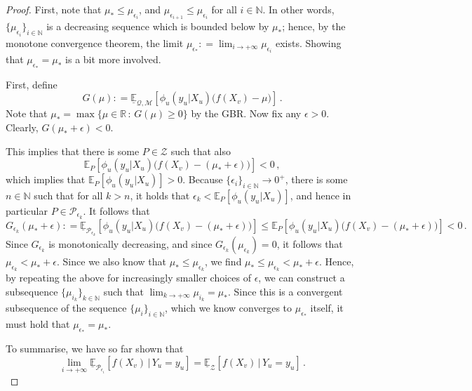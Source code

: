 \documentclass[twoside,11pt]{article}
\newcommand{\nats}{\mathbb{N}}
\newcommand{\reals}{\mathbb{R}}
\newcommand{\lexp}{\underline{\mathbb{E}}_{\rateset,\mathcal{M}}}
\newcommand{\rateset}{\mathcal{Q}}
\newcommand{\coloneqq}{:\!=}
\begin{document}
\begin{proof}
First, note that $\mu_*\leq \mu_{\epsilon_i}$, and $\mu_{\epsilon_{i+1}}\leq \mu_{\epsilon_i}$ for all $i\in\nats$. In other words, $\{\mu_{\epsilon_i}\}_{i\in\nats}$ is a decreasing sequence which is bounded below by $\mu_*$; hence, by the monotone convergence theorem, the limit $\mu_{\epsilon_*}\coloneqq\lim_{i\to+\infty}\mu_{\epsilon_i}$ exists. Showing that $\mu_{\epsilon_*}=\mu_*$ is a bit more involved.

First, define
\begin{equation*}
G(\mu) \coloneqq \lexp[\phi_u(y_u\vert X_u)\bigl(f(X_v) - \mu\bigr)]\,.
\end{equation*}
Note that $\mu_*=\max\{\mu\in\reals\,:\,G(\mu)\geq 0\}$ by the GBR. Now fix any $\epsilon>0$. Clearly, $G(\mu_* + \epsilon)< 0$.

This implies that there is some $P\in\mathcal{Z}$ such that also
\begin{equation*}
\mathbb{E}_P[\phi_u(y_u\vert X_u)\bigl(f(X_v) - (\mu_*+\epsilon)\bigr)] < 0\,,
\end{equation*}
which implies that $\mathbb{E}_P[\phi_u(y_u\vert X_u)]>0$. Because $\{\epsilon_i\}_{i\in\nats}\to 0^+$, there is some $n\in\nats$ such that for all $k>n$, it holds that $\epsilon_k < \mathbb{E}_P[\phi_u(y_u\vert X_u)]$, and hence in particular $P\in\mathcal{P}_{\epsilon_k}$. It follows that
\begin{equation*}
G_{\epsilon_k}(\mu_*+\epsilon) \coloneqq \underline{\mathbb{E}}_{\mathcal{P}_{\epsilon_k}}[\phi_u(y_u\vert X_u)\bigl(f(X_v) - (\mu_*+\epsilon)\bigr)] \leq \mathbb{E}_P[\phi_u(y_u\vert X_u)\bigl(f(X_v) - (\mu_*+\epsilon)\bigr)] < 0\,.
\end{equation*}
Since $G_{\epsilon_k}$ is monotonically decreasing, and since $G_{\epsilon_k}(\mu_{\epsilon_k})=0$, it follows that $\mu_{\epsilon_k} < \mu_*+\epsilon$. Since we also know that $\mu_*\leq \mu_{\epsilon_k}$, we find $\mu_*\leq \mu_{\epsilon_k}<\mu_*+\epsilon$. Hence, by repeating the above for increasingly smaller choices of $\epsilon$, we can construct a subsequence $\{\mu_{i_k}\}_{k\in\nats}$ such that $\lim_{k\to+\infty}\mu_{i_k}=\mu_*$. Since this is a convergent subsequence of the sequence $\{\mu_i\}_{i\in\nats}$, which we know converges to $\mu_{\epsilon_*}$ itself, it must hold that $\mu_{\epsilon_*}=\mu_*$.

To summarise, we have so far shown that
\begin{equation}\label{eq:reg_ext_limit:updated_converges_in_subset}
\lim_{i\to+\infty}\underline{\mathbb{E}}_{\mathcal{P}_{\epsilon_i}}[f(X_v)\,\vert\,Y_u=y_u] = \underline{\mathbb{E}}_{\mathcal{Z}}[f(X_v)\,\vert\,Y_u=y_u]\,.
\end{equation}


\end{proof}
\end{document}
